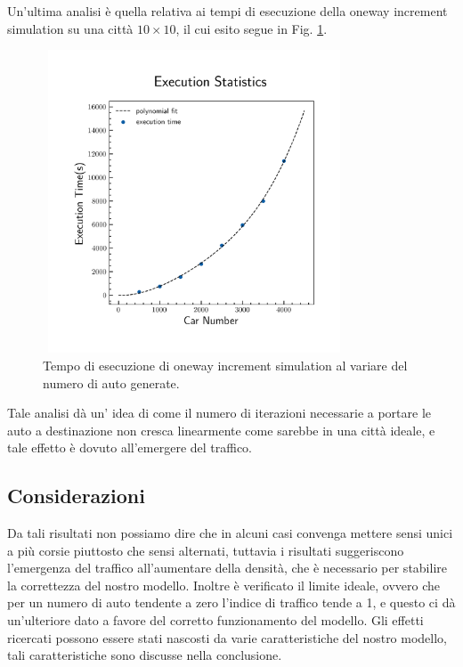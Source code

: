 \documentclass{article}
\begin{document}
        \newpage

        Un'ultima analisi è quella relativa ai tempi di esecuzione della oneway increment simulation su una città $10 \times 10$, il cui esito segue in Fig. \ref{fig:10}.

        \begin{figure}[H]
            \centering
            \includegraphics[width=9cm, height=9cm]{execution_time.png}
            \caption{Tempo di esecuzione di oneway increment simulation al variare del numero di auto generate.}
            \label{fig:10}
        \end{figure}

        Tale analisi dà un' idea di come il numero di iterazioni necessarie a portare le auto a destinazione non cresca linearmente come sarebbe in una città ideale,
        e tale effetto è dovuto all'emergere del traffico.

        \subsection{Considerazioni}

        Da tali risultati non possiamo dire che in alcuni casi convenga mettere sensi unici a più corsie piuttosto che sensi alternati,
        tuttavia i risultati suggeriscono l'emergenza del traffico all'aumentare della densità, che è necessario per stabilire la correttezza del 
        nostro modello. Inoltre è verificato il limite ideale, ovvero che per un numero di auto tendente a zero l'indice di traffico tende a 1, e 
        questo ci dà un'ulteriore dato a favore del corretto funzionamento del modello. Gli effetti ricercati possono essere stati nascosti da 
        varie caratteristiche del nostro modello, tali caratteristiche sono discusse nella conclusione.

    
\end{document}
